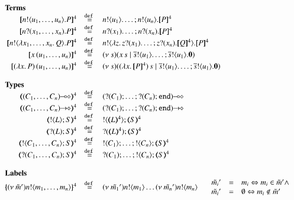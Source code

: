 \begin{figure}[t]
	\[
		\begin{array}{rcl}
			\multicolumn{3}{l}{\textrm{\bf Terms}}
			\\
			\pmap{\bout{n}{u_1, \dots, u_n} P}{4} &\defeq& \bout{n}{u_1} \dots ; \bout{n}{u_n} \pmap{P}{4}
			\\
			\pmap{\binp{n}{x_1, \dots, x_n} P}{4} &\defeq& \binp{n}{x_1} \dots ; \binp{n}{x_n} \pmap{P}{4}
			\\
			\pmap{\bout{n}{\abs{x_1, \dots, x_n}{Q}} P}{4} &\defeq& \bout{n}{\abs{z}{\binp{z}{x_1} \dots; \binp{z}{x_n} \pmap{Q}{4}}} \pmap{P}{4}
			\\
			\pmap{\appl{x}{(u_1, \dots, u_n)}}{4} &\defeq& \newsp{s}{\appl{x}{s} \Par \bout{\dual{s}}{u_1} \dots; \bout{\dual{s}}{u_1} \inact}
			\\
			\pmap{\appl{(\abs{x}{P})}{(u_1, \dots, u_n)}}{4} &\defeq& \newsp{s}{\appl{(\abs{x}{\pmap{P}{4}})}{s} \Par \bout{\dual{s}}{u_1} \dots; \bout{\dual{s}}{u_1} \inact}
			\\
			\\
			\multicolumn{3}{l}{\textrm{\bf Types}}
			\\
			\tmap{\lhot{(C_1, \dots, C_n)}}{4} &\defeq& \lhot{(\btinp{C_1} \dots; \btinp{C_n} \tinact)}
			\\
			\tmap{\shot{(C_1, \dots, C_n)}}{4} &\defeq& \shot{(\btinp{C_1} \dots; \btinp{C_n} \tinact)}
			\\
			\tmap{\btout{L} S}{4} &\defeq& \btout{\tmap{L}{4}} \tmap{S}{4}
			\\
			\tmap{\btinp{L} S}{4} &\defeq& \btinp{\tmap{L}{4}} \tmap{S}{4}
			\\
			\tmap{\btout{C_1, \dots, C_n} S}{4} &\defeq& \btout{C_1} \dots; \btout{C_n} \tmap{S}{4}
			\\
			\tmap{\btinp{C_1, \dots, C_n} S}{4} &\defeq& \btinp{C_1} \dots; \btout{C_n} \tmap{S}{4}
			\\
			\\
			\multicolumn{3}{l}{\textrm{\bf Labels}}
			\\
			\mapa{\news{\tilde{m}'} \bactout{n}{m_1, \dots, m_n}}^{4} &\defeq& \news{\tilde{m_1}'} \bactout{n}{m_1} \dots \news{\tilde{m_n}'}\bactout{n}{m_n}
			\quad \left.
			\begin{array}{rcl}
				\tilde{m_i}' &=& m_i \Leftrightarrow m_i \in \tilde{m}' \wedge\\
				\tilde{m_i}' &=& \es \Leftrightarrow m_i \notin \tilde{m}'
			\end{array}
			\right.
			\\

\end{array}\]
\end{figure}
